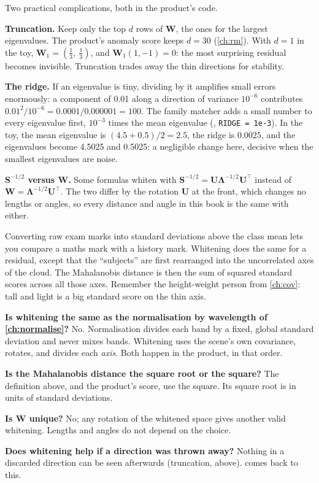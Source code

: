 \documentclass[11pt,a4paper,oneside,openany]{book}
\newcommand{\B}[1]{{\symbf{#1}}}
\newcommand{\B}[1]{{\bm{#1}}}
\newcommand{\T}{^{\top}}
\newcommand{\mS}{\B{S}}
\newcommand{\mW}{\B{W}}
\newcommand{\mU}{\B{U}}
\newcommand{\mLam}{\B{\Lambda}}
\begin{document}
Two practical complications, both in the product's code.

\textbf{Truncation.} Keep only the top $d$ rows of $\mW$, the ones for the largest eigenvalues. The product's anomaly score
keeps $d=30$ (\cref{ch:rm}). With $d=1$ in the toy, $\mW_1=(\frac13,\ \frac13)$, and $\mW_1(1,-1)=0$: the most surprising
residual becomes invisible. Truncation trades away the thin directions for stability.

\textbf{The ridge.} If an eigenvalue is tiny, dividing by it amplifies small errors enormously: a component of 0.01 along a
direction of variance $10^{-6}$ contributes $0.01^2/10^{-6}=0.0001/0.000001=100$. The family matcher adds a small number to
every eigenvalue first, $10^{-3}$ times the mean eigenvalue (, \texttt{RIDGE = 1e-3}).
In the toy, the mean eigenvalue is $(4.5+0.5)/2=2.5$, the ridge is $0.0025$, and the eigenvalues become 4.5025 and 0.5025: a
negligible change here, decisive when the smallest eigenvalues are noise.

\textbf{$\mS^{-1/2}$ versus $\mW$.} Some formulas whiten with $\mS^{-1/2}=\mU\mLam^{-1/2}\mU\T$ instead of $\mW=\mLam^{-1/2}\mU\T$. The
two differ by the rotation $\mU$ at the front, which changes no lengths or angles, so every distance and angle in this book is
the same with either.

\begin{analogy}
Converting raw exam marks into standard deviations above the class mean lets you compare a maths mark with a history mark.
Whitening does the same for a residual, except that the ``subjects'' are first rearranged into the uncorrelated axes of the
cloud. The Mahalanobis distance is then the sum of squared standard scores across all those axes. Remember the height-weight
person from \cref{ch:cov}: tall and light is a big standard score on the thin axis.
\end{analogy}

\begin{confusions}
\textbf{Is whitening the same as the normalisation by wavelength of \cref{ch:normalise}?} No. Normalisation divides each band by
a fixed, global standard deviation and never mixes bands. Whitening uses the scene's own covariance, rotates, and divides each
\emph{axis}. Both happen in the product, in that order.

\textbf{Is the Mahalanobis distance the square root or the square?} The definition above, and the product's score, use the
square. Its square root is in units of standard deviations.

\textbf{Is $\mW$ unique?} No; any rotation of the whitened space gives another valid whitening. Lengths and angles do not
depend on the choice.

\textbf{Does whitening help if a direction was thrown away?} Nothing in a discarded direction can be seen afterwards
(truncation, above).  comes back to this.
\end{confusions}
\end{document}

